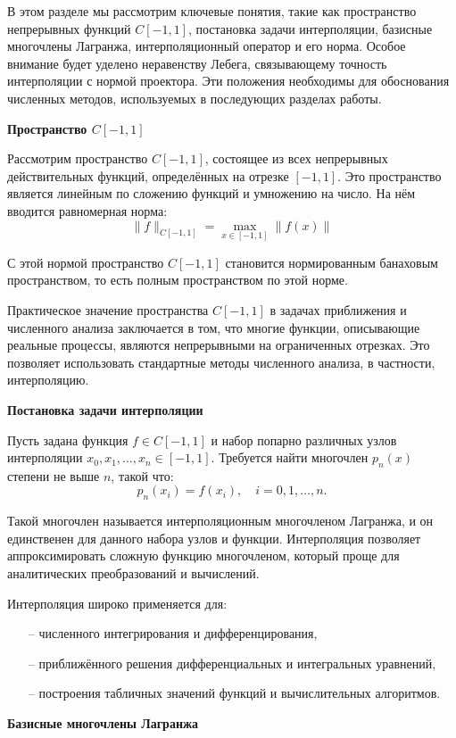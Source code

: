 \documentclass[14pt,openany,a4paper,oneside]{extarticle}
\begin{document}
	В этом разделе мы рассмотрим ключевые понятия, такие как пространство непрерывных функций $C[-1, 1]$, постановка задачи интерполяции, базисные многочлены Лагранжа, интерполяционный оператор и его норма. Особое внимание будет уделено неравенству Лебега, связывающему точность интерполяции с нормой проектора. Эти положения необходимы для обоснования численных методов, используемых в последующих разделах работы.
	
	\textbf{Пространство $C[-1,1]$}
	
	Рассмотрим пространство $C[-1,1]$, состоящее из всех непрерывных действительных функций, определённых на отрезке $[-1,1]$. Это пространство является линейным по сложению функций и умножению на число. На нём вводится равномерная норма: 
	$$\|f\|_{C[-1,1]}=\max_{x\in[-1,1]}\|f(x)\|$$
	
	С этой нормой пространство $C[-1,1]$ становится нормированным банаховым пространством, то есть полным пространством по этой норме.
	
	Практическое значение пространства $C[-1,1]$ в задачах приближения и численного анализа заключается в том, что многие функции, описывающие реальные процессы, являются непрерывными на ограниченных отрезках. Это позволяет использовать стандартные методы численного анализа, в частности, интерполяцию.
	
	\textbf{Постановка задачи интерполяции}
	
	Пусть задана функция $f \in C[-1,1]$ и набор попарно различных узлов интерполяции $x_0,x_1,\dots,x_n \in [-1,1]$. Требуется найти многочлен $p_n(x)$ степени не выше $n$, такой что: $$p_n(x_i)=f(x_i), \quad i=0,1,\dots,n.$$
	
	Такой многочлен называется интерполяционным многочленом Лагранжа, и он единственен для данного набора узлов и функции. Интерполяция позволяет аппроксимировать сложную функцию многочленом, который проще для аналитических преобразований и вычислений.
	
	Интерполяция широко применяется для:
	
	\begin{enumerate}
		\item[--] численного интегрирования и дифференцирования,
		\item[--] приближённого решения дифференциальных и интегральных уравнений,
		\item[--] построения табличных значений функций и вычислительных алгоритмов.
	\end{enumerate}
	
	\textbf{Базисные многочлены Лагранжа}
	
\end{document}
